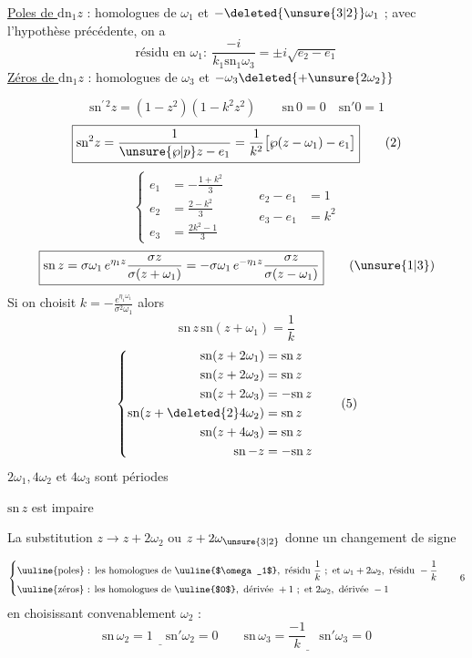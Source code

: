 \uline{Poles de $\mathrm{dn}_1z$} : homologues de $\omega_1$ et $-\deleted{\unsure{3|2}}\omega_1$ ; avec l'hypothèse précédente, on a
\[
\text{résidu en }\omega_1:\ \frac{-i}{k_1\mathrm{sn}_1\omega_3}=\pm i\sqrt{e_2-e_1}
\]
\uline{Zéros de $\mathrm{dn}_1z$} : homologues de $\omega_3$ et $-\omega_3\deleted{+\unsure{2\omega_2}}$


\[
\boxed{\mathrm{sn}^{\prime\,2}z=(1-z^2)(1-k^2z^2)}\qquad \mathrm{sn}\,0=0\quad \mathrm{sn}'0=1 \tag*{(1)}
\]
\[
\boxed{\mathrm{sn}^2z=\frac{1}{\unsure{\wp|p}z-e_1}=\frac1{k^2}\bigl[\wp(z-\omega_1)-e_1\bigr]}\tag*{(2)}
\]
\[
\left\{\begin{aligned}
e_1&=-\frac{1+k^2}{3}\\
e_2&=\frac{2-k^2}{3}\\
e_3&=\frac{2k^2-1}{3}
\end{aligned}\right.
\qquad\begin{aligned}e_2-e_1&=1\\e_3-e_1&=k^2\end{aligned}
\]
\[
\boxed{\mathrm{sn}\,z=\sigma\omega_1\,e^{\eta_1 z}\frac{\sigma z}{\sigma(z+\omega_1)}
=-\sigma\omega_1\,e^{-\eta_1z}\frac{\sigma z}{\sigma(z-\omega_1)}}\tag*{(\unsure{1|3})}
\]
Si on choisit \uline{$k=-\frac{e^{\eta_1\omega_1}}{\sigma^2\omega_1}$} alors
\[
\boxed{\mathrm{sn}\,z\,\mathrm{sn}(z+\omega_1)=\frac1k}\tag*{(4)}
\]
\[
\left\{\begin{aligned}
\mathrm{sn}(z+2\omega_1)&=\mathrm{sn}\,z\\
\mathrm{sn}(z+2\omega_2)&=\mathrm{sn}\,z\\
\mathrm{sn}(z+2\omega_3)&=-\mathrm{sn}\,z\\
\mathrm{sn}(z+\deleted{2}4\omega_2)&=\mathrm{sn}\,z\\
\mathrm{sn}(z+4\omega_3)&=\mathrm{sn}\,z\\
\mathrm{sn}\,{-z}&=-\mathrm{sn}\,z
\end{aligned}\right.\tag*{(5)}
\]
$2\omega_1,4\omega_2$ et $4\omega_3$ sont périodes

$\mathrm{sn}\,z$ est impaire

La substitution $z\to z+2\omega_2$ ou $z+2\omega_{\unsure{3|2}}$ donne un changement de signe

\[
\left\{\begin{aligned}
&\text{\uuline{poles} : les homologues de }\text{\uuline{$\omega_1$}},\ \text{résidu }\frac1k\ ;\ \text{et }\omega_1+2\omega_2,\ \text{résidu }-\frac1k\\
&\text{\uuline{zéros} : les homologues de }\text{\uuline{$0$}},\ \text{dérivée }+1\ ;\ \text{et }2\omega_2,\ \text{dérivée }-1
\end{aligned}\right.\tag*{6}
\]
en choisissant convenablement $\omega_{2}$ :
\[
\underline{\mathrm{sn}\,\omega_2=1\quad\mathrm{sn}'\omega_2=0}
\qquad\underline{\mathrm{sn}\,\omega_3=\frac{-1}{k}\quad\mathrm{sn}'\omega_3=0}
\]

